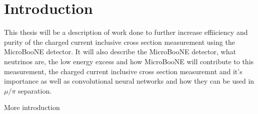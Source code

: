 \chapter{Introduction}
This thesis will be a description of work done to further increase effiiciency and purity of the charged current inclusive cross section measurement using the MicroBooNE detector. It will also describe the MicroBooNE detector, what neutrinos are, the low energy excess and how MicroBooNE will contribute to this measurement, the charged current inclusive cross section measuremnt and it's importance as well as convolutional neural networks and how they can be used in $\mu/\pi$ separation. 
\clearpage

More introduction
